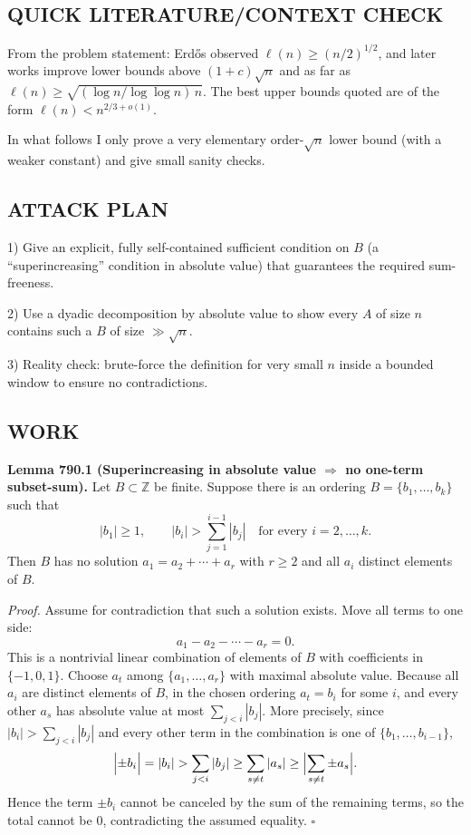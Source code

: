 \subsection*{QUICK LITERATURE/CONTEXT CHECK}
From the problem statement: Erd\H{o}s observed $\ell(n)\ge (n/2)^{1/2}$, and later works improve lower bounds above $(1+c)\sqrt n$ and as far as $\ell(n)\ge \sqrt{(\log n/\log\log n)\,n}$. The best upper bounds quoted are of the form $\ell(n)<n^{2/3+o(1)}$.

In what follows I only prove a very elementary order-$\sqrt n$ lower bound (with a weaker constant) and give small sanity checks.

\subsection*{ATTACK PLAN}
1) Give an explicit, fully self-contained sufficient condition on $B$ (a ``superincreasing'' condition in absolute value) that guarantees the required sum-freeness.

2) Use a dyadic decomposition by absolute value to show every $A$ of size $n$ contains such a $B$ of size $\gg \sqrt n$.

3) Reality check: brute-force the definition for very small $n$ inside a bounded window to ensure no contradictions.

\subsection*{WORK}
\textbf{Lemma 790.1 (Superincreasing in absolute value $\Rightarrow$ no one-term subset-sum).}
Let $B\subset\mathbb Z$ be finite. Suppose there is an ordering $B=\{b_1,\dots,b_k\}$ such that
\[
|b_1|\ge 1,\qquad |b_{i}| > \sum_{j=1}^{i-1} |b_j|\quad\text{for every }i=2,\dots,k.
\]
Then $B$ has no solution $a_1=a_2+\cdots+a_r$ with $r\ge 2$ and all $a_i$ distinct elements of $B$.

\emph{Proof.}
Assume for contradiction that such a solution exists. Move all terms to one side:
\[
 a_1 - a_2 - \cdots - a_r = 0.
\]
This is a nontrivial linear combination of elements of $B$ with coefficients in $\{-1,0,1\}$. Choose $a_t$ among $\{a_1,\dots,a_r\}$ with maximal absolute value.
Because all $a_i$ are distinct elements of $B$, in the chosen ordering $a_t=b_i$ for some $i$, and every other $a_s$ has absolute value at most $\sum_{j<i}|b_j|$.
More precisely, since $|b_i|>\sum_{j<i}|b_j|$ and every other term in the combination is one of $\{b_1,\dots,b_{i-1}\}$,
\[
\Bigl|\pm b_i\Bigr| = |b_i| > \sum_{j<i}|b_j| \ge \sum_{\substack{s\ne t}} |a_s| \ge \Bigl|\sum_{\substack{s\ne t}} \pm a_s\Bigr|.
\]
Hence the term $\pm b_i$ cannot be canceled by the sum of the remaining terms, so the total cannot be $0$, contradicting the assumed equality. \hfill$\square$

